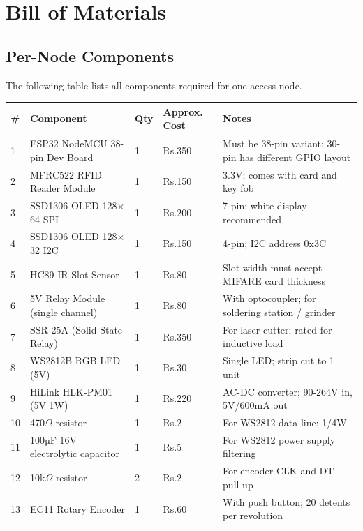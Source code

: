 \chapter{Bill of Materials}
\label{app:bom}

\section{Per-Node Components}

The following table lists all components required for one access node.

\begin{longtable}{C{0.5cm}L{4.5cm}C{1.5cm}L{3cm}L{4cm}}
\toprule
\textbf{\#} & \textbf{Component} & \textbf{Qty} & \textbf{Approx. Cost} & \textbf{Notes} \\
\midrule
{}  & ESP32 NodeMCU 38-pin Dev Board & 1 & Rs.350  & Must be 38-pin variant; 30-pin has different GPIO layout \\
2  & MFRC522 RFID Reader Module     & 1 & Rs.150  & 3.3V; comes with card and key fob \\
3  & SSD1306 OLED 128$\times$64 SPI  & 1 & Rs.200  & 7-pin; white display recommended \\
4  & SSD1306 OLED 128$\times$32 I2C  & 1 & Rs.150  & 4-pin; I2C address 0x3C \\
5  & HC89 IR Slot Sensor            & 1 & Rs.80   & Slot width must accept MIFARE card thickness \\
6  & 5V Relay Module (single channel) & 1 & Rs.80  & With optocoupler; for soldering station / grinder \\
7  & SSR 25A (Solid State Relay)    & 1 & Rs.350  & For laser cutter; rated for inductive load \\
8  & WS2812B RGB LED (5V)           & 1 & Rs.30   & Single LED; strip cut to 1 unit \\
9  & HiLink HLK-PM01 (5V 1W)       & 1 & Rs.220  & AC-DC converter; 90-264V in, 5V/600mA out \\
10 & 470$\Omega$ resistor            & 1 & Rs.2    & For WS2812 data line; 1/4W \\
11 & 100µF 16V electrolytic capacitor & 1 & Rs.5  & For WS2812 power supply filtering \\
12 & 10k$\Omega$ resistor            & 2 & Rs.2    & For encoder CLK and DT pull-up \\
13 & EC11 Rotary Encoder            & 1 & Rs.60   & With push button; 20 detents per revolution \\

\end{longtable}
